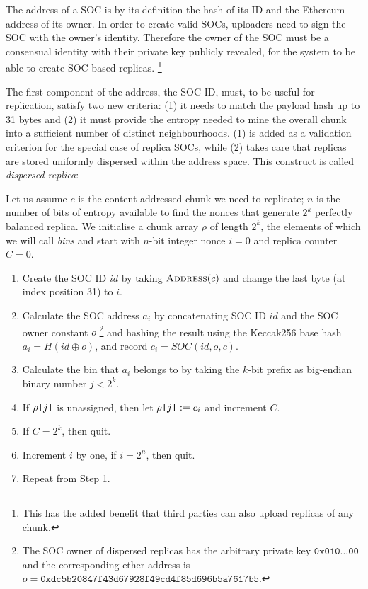 \documentclass[manuscript,screen,review]{acmart}
\newcommand{\idx}[1]{\texttt{[}\/#1\/\texttt{]}}
\DeclareMathOperator{\concat}{\operatorname{\oplus}}
\begin{document}
The address of a SOC is by its definition the hash of its ID and the Ethereum address of its owner. In order to create valid SOCs, uploaders need to sign the SOC with the owner's identity. Therefore the owner of the SOC must be a consensual identity with their private key publicly revealed, for the system to be able to create SOC-based replicas.
%
\footnote{This has the added benefit that third parties can also upload replicas of any chunk.}

The first component of the address, the SOC ID, must, to be useful for replication, satisfy two new criteria: (1) it needs to match the payload hash up to 31 bytes and (2) it must provide the entropy needed to mine the overall chunk into a sufficient number of distinct neighbourhoods. (1) is added as a validation criterion for the special case of replica SOCs, while (2) takes care that replicas are stored uniformly dispersed within the address space.
This construct is called \emph{dispersed replica}:

Let us assume $c$ is the content-addressed chunk we need to replicate; $n$ is the number of bits of entropy available to find the nonces that generate  $2^k$  perfectly balanced replica. We initialise a chunk array $\rho$ of length $2^k$, the elements of which we will call \emph{bins} and start with $n$-bit integer nonce $i=0$ and replica counter $C=0$.

\begin{enumerate}[noitemsep]
  \item Create the SOC ID $id$ by taking $\textsc{Address}(c)$ and change the last byte (at index position 31) to  $i$.
  \item Calculate the SOC address $a_i$ by concatenating SOC ID $id$ and the SOC owner constant $o$%
%
\footnote{The SOC owner of dispersed replicas has the arbitrary private key $\texttt{0x010...00}$
and the corresponding ether address is
$o = \texttt{0xdc5b20847f43d67928f49cd4f85d696b5a7617b5} $.}
%
and hashing the result using the Keccak256 base hash $a_i=H(id\concat o)$, and record $c_i=\mathit{SOC}(id,o,c)$.
  \item Calculate the bin that $a_i$ belongs to by taking the $k$-bit prefix as big-endian binary number $j<2^k$.
  \item If $\rho\idx{j}$ is unassigned, then let $\rho\idx{j}:=c_i$ and increment $C$.
  \item If $C=2^k$, then quit.
  \item Increment $i$ by one, if $i=2^n$, then quit.
  \item Repeat from Step 1.
\end{enumerate}
\end{document}
